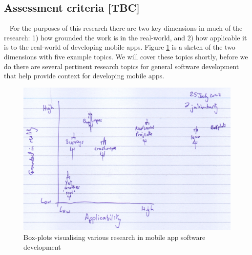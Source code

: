 \subsection{Assessment criteria [TBC]}~\label{rw-assessment-criteria-topic}
For the purposes of this research there are two key dimensions in much of the research: 1) how grounded the work is in the real-world, and 2) how applicable it is to the real-world of developing mobile apps. Figure \ref{fig:grounded-and-applicable-boxplots} is a sketch of the two dimensions with five example topics. We will cover these topics shortly, %
before we do there are several pertinent research topics for general software development that help provide context for developing mobile apps.

\begin{figure}
    \centering
    \includegraphics[width=\linewidth]{images/rough-sketches/grounded-and-applicable.jpeg}
    \caption{Box-plots visualising various research in mobile app software development}
    \label{fig:grounded-and-applicable-boxplots}
\end{figure}


